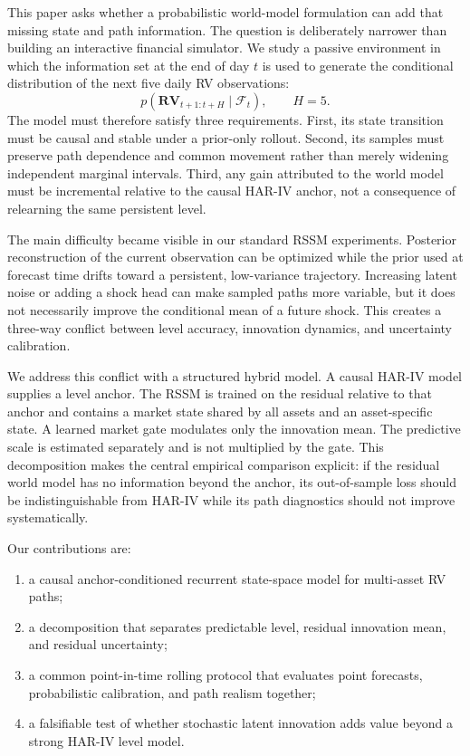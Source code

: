 \documentclass[11pt]{article}
\newcommand{\cF}{\mathcal F}
\begin{document}
This paper asks whether a probabilistic world-model formulation can add that missing state and path information. The question is deliberately narrower than building an interactive financial simulator. We study a passive environment in which the information set at the end of day $t$ is used to generate the conditional distribution of the next five daily RV observations:
\begin{equation}
    p(\mathbf{RV}_{t+1:t+H}\mid\cF_t), \qquad H=5.
\end{equation}
The model must therefore satisfy three requirements. First, its state transition must be causal and stable under a prior-only rollout. Second, its samples must preserve path dependence and common movement rather than merely widening independent marginal intervals. Third, any gain attributed to the world model must be incremental relative to the causal HAR-IV anchor, not a consequence of relearning the same persistent level.

The main difficulty became visible in our standard RSSM experiments. Posterior reconstruction of the current observation can be optimized while the prior used at forecast time drifts toward a persistent, low-variance trajectory. Increasing latent noise or adding a shock head can make sampled paths more variable, but it does not necessarily improve the conditional mean of a future shock. This creates a three-way conflict between level accuracy, innovation dynamics, and uncertainty calibration.

We address this conflict with a structured hybrid model. A causal HAR-IV model supplies a level anchor. The RSSM is trained on the residual relative to that anchor and contains a market state shared by all assets and an asset-specific state. A learned market gate modulates only the innovation mean. The predictive scale is estimated separately and is not multiplied by the gate. This decomposition makes the central empirical comparison explicit: if the residual world model has no information beyond the anchor, its out-of-sample loss should be indistinguishable from HAR-IV while its path diagnostics should not improve systematically.

Our contributions are:
\begin{enumerate}[leftmargin=2em]
    \item a causal anchor-conditioned recurrent state-space model for multi-asset RV paths;
    \item a decomposition that separates predictable level, residual innovation mean, and residual uncertainty;
    \item a common point-in-time rolling protocol that evaluates point forecasts, probabilistic calibration, and path realism together;
    \item a falsifiable test of whether stochastic latent innovation adds value beyond a strong HAR-IV level model.
\end{enumerate}
\end{document}
